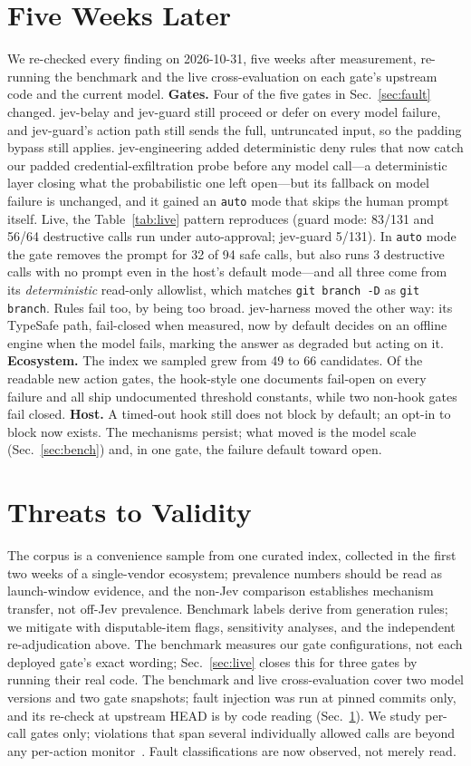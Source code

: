 \documentclass[conference]{IEEEtran}
\newcommand{\code}[1]{\texttt{\small #1}}
\begin{document}
\section{Five Weeks Later}
\label{sec:recheck}
We re-checked every finding on 2026-10-31, five weeks after measurement, re-running the
benchmark and the live cross-evaluation on each gate's upstream code and the current model. \textbf{Gates.}
Four of the five gates in Sec.~\ref{sec:fault} changed. jev-belay and jev-guard still
proceed or defer on every model failure, and jev-guard's action path still sends the full,
untruncated input, so the padding bypass still applies. jev-engineering added deterministic
deny rules that now catch our padded credential-exfiltration probe before any model
call---a deterministic layer closing what the probabilistic one left open---but its
fallback on model failure is unchanged, and it gained an \code{auto} mode that skips the
human prompt itself. Live, the Table~\ref{tab:live} pattern reproduces (guard mode: 83/131 and
56/64 destructive calls run under auto-approval; jev-guard 5/131). In \code{auto} mode the gate
removes the prompt for 32 of 94 safe calls, but also runs 3 destructive calls with no prompt
even in the host's default mode---and all three come from its \emph{deterministic} read-only
allowlist, which matches \mbox{\code{git branch -D}} as \mbox{\code{git branch}}. Rules fail too, by being
too broad. jev-harness moved the other way: its TypeSafe
path, fail-closed when measured, now by default decides on an offline engine when the model
fails, marking the answer as degraded but acting on it. \textbf{Ecosystem.} The index we
sampled grew from 49 to 66 candidates. Of the readable new action gates, the hook-style one
documents fail-open on every failure and all ship undocumented threshold constants, while two
non-hook gates fail closed. \textbf{Host.} A timed-out hook still does not block by default;
an opt-in to block now exists. The mechanisms persist; what moved is the model scale
(Sec.~\ref{sec:bench}) and, in one gate, the failure default toward open.

\section{Threats to Validity}
The corpus is a convenience sample from one curated index, collected in the first two weeks
of a single-vendor ecosystem; prevalence numbers should be read as launch-window evidence, and the non-Jev
comparison establishes mechanism transfer, not off-Jev prevalence. Benchmark labels derive
from generation rules; we mitigate with disputable-item flags, sensitivity analyses, and the
independent re-adjudication above. The benchmark measures our gate configurations, not each
deployed gate's exact wording; Sec.~\ref{sec:live} closes this for three gates by running
their real code. The benchmark and live cross-evaluation cover two model versions and two gate snapshots;
fault injection was run at pinned commits only, and its re-check at upstream HEAD is by code
reading (Sec.~\ref{sec:recheck}). We study per-call gates only; violations that span several individually allowed calls are
beyond any per-action monitor~\cite{localallow2026}. Fault
classifications are now observed, not merely read.
\end{document}
